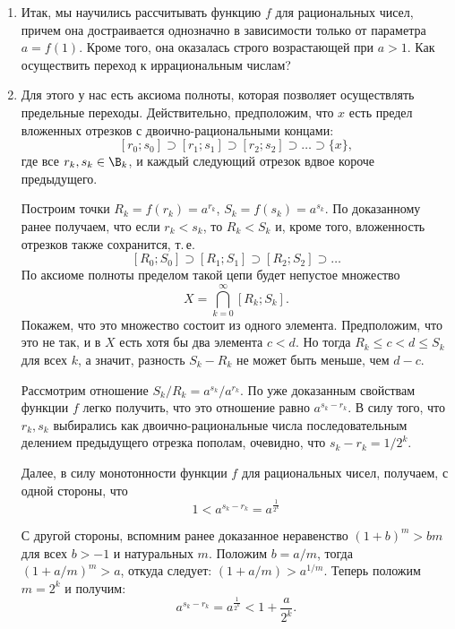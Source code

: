 \begin{enumerate}


\item Итак, мы научились рассчитывать функцию $f$ для рациональных чисел, причем она достраивается однозначно в зависимости только от параметра $a=f(1)$. Кроме того, она оказалась строго возрастающей при $a>1$. Как осуществить переход к иррациональным числам?

\item Для этого у нас есть аксиома полноты, которая позволяет осуществлять предельные переходы. Действительно, предположим, что $x$ есть предел вложенных отрезков с двоично-рациональными концами:
$$
[r_0;s_0]\supset [r_1;s_1]\supset [r_2;s_2]\supset \dots \supset\{x\},
$$
где все $r_k,s_k\in\B_k$, и каждый следующий отрезок вдвое короче предыдущего.

Построим точки $R_k=f(r_k)=a^{r_k}$, $S_k=f(s_k)=a^{s_k}$. По доказанному ранее получаем, что если $r_k<s_k$, то $R_k<S_k$ и, кроме того, вложенность отрезков также сохранится, т.\,е.
$$
[R_0;S_0]\supset [R_1;S_1]\supset [R_2;S_2]\supset \dots
$$
По аксиоме полноты пределом такой цепи будет непустое множество
$$
X=\bigcap_{k=0}^\infty [R_k;S_k].
$$
Покажем, что это множество состоит из одного элемента. Предположим, что это не так, и в $X$ есть хотя бы два элемента $c<d$. Но тогда $R_k\le c<d\le S_k$ для всех $k$, а значит, разность $S_k-R_k$ не может быть меньше, чем $d-c$.


Рассмотрим отношение $S_k/R_k=a^{s_k}/a^{r_k}$. По уже доказанным свойствам функции $f$ легко получить, что это отношение равно
$a^{s_k-r_k}$. В силу того, что $r_k,s_k$ выбирались как двоично-рациональные числа последовательным делением предыдущего отрезка пополам, очевидно, что $s_k-r_k=1/2^k$.

Далее, в силу монотонности функции $f$ для рациональных чисел, получаем, с одной стороны, что
\begin{equation}\label{asrk1}
1<a^{s_k-r_k}=a^{\frac{1}{2^k}}
\end{equation}

С другой стороны, вспомним ранее доказанное неравенство $(1+b)^m>bm$ для всех $b>-1$ и натуральных $m$. Положим $b=a/m$, тогда $(1+a/m)^m>a$, откуда следует: $(1+a/m)>a^{1/m}$. Теперь положим $m=2^k$ и получим:
\begin{equation}\label{asrk2}
a^{s_k-r_k}=a^{\frac{1}{2^k}}<1+\frac{a}{2^k}.
\end{equation}


\end{enumerate}
